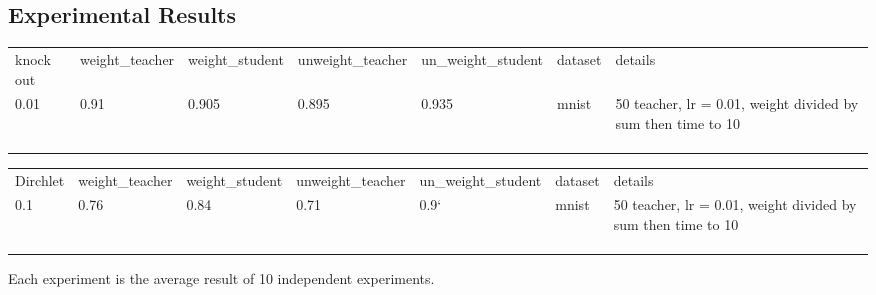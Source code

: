 \documentclass{article}
\theoremstyle{definition}
\begin{document}
\subsection{Experimental Results}
\begin{table}[]
\begin{tabular}{lllllll}
knock out              & weight\_teacher & weight\_student & unweight\_teacher & un\_weight\_student & dataset & details                                                      \\
 0.01 & 0.91            & 0.905           & 0.895             & 0.935               & mnist   & 50 teacher, lr = 0.01, weight divided by sum then time to 10 \\
                    &                 &                 &                   &                     &         &                                                              \\
                    &                 &                 &                   &                     &         &                                                              \\
                    &                 &                 &                   &                     &         &                                                             
\end{tabular}
\end{table}
\begin{table}[]
\begin{tabular}{lllllll}
Dirchlet           & weight\_teacher & weight\_student & unweight\_teacher & un\_weight\_student & dataset & details                                                      \\
 0.1 & 0.76           & 0.84           & 0.71          & 0.9`             & mnist   & 50 teacher, lr = 0.01, weight divided by sum then time to 10 \\
                    &                 &                 &                   &                     &         &                                                              \\
                    &                 &                 &                   &                     &         &                                                              \\
                    &                 &                 &                   &                     &         &                                                             
\end{tabular}
\end{table}
Each experiment is the average result of 10 independent experiments.
\end{document}
